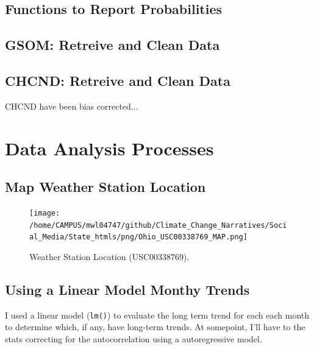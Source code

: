 \documentclass{article}\usepackage[]{graphicx}\usepackage[]{color}
\makeatletter
\newenvironment{kframe}{%
 \def\at@end@of@kframe{}%
 \ifinner\ifhmode%
  \def\at@end@of@kframe{\end{minipage}}%
  \begin{minipage}{\columnwidth}%
 \fi\fi%
 \def\FrameCommand##1{\hskip\@totalleftmargin \hskip-\fboxsep
 \colorbox{shadecolor}{##1}\hskip-\fboxsep
     \hskip-\linewidth \hskip-\@totalleftmargin \hskip\columnwidth}%
 \MakeFramed {\advance\hsize-\width
   \@totalleftmargin\z@ \linewidth\hsize
   \@setminipage}}%
 {\par\unskip\endMakeFramed%
 \at@end@of@kframe}
\newenvironment{knitrout}{}{} %
\makeatother
\begin{document}
\subsection{Functions to Report Probabilities}




\subsection{GSOM: Retreive and Clean Data}



\subsection{CHCND: Retreive and Clean Data}

CHCND have been bias corrected...


\section{Data Analysis Processes}

\subsection{Map Weather Station Location}

\begin{knitrout}
\color{fgcolor}\begin{kframe}


{\ttfamily\noindent\bfseries\color{errorcolor}{\#\# Error in eval(expr, envir, enclos): object 'AIzaSyDYUc3ExxqFTOHtyxyr6' not found}}\end{kframe}
\end{knitrout}




\begin{figure}
\texttt{[image: /home/CAMPUS/mwl04747/github/Climate\_Change\_Narratives/Social\_Media/State\_htmls/png/Ohio\_USC00338769\_MAP.png]}
\caption{Weather Station Location (USC00338769). }
\label{fig:Map}
\end{figure}

\subsection{Using a Linear Model Monthy Trends}

I used a linear model (\texttt{lm()}) to evaluate the long term trend for each each month to determine which, if any, have long-term trends. At somepoint, I'll have to the stats correcting for the autocorrelation using a autoregressive model.  
\end{document}
